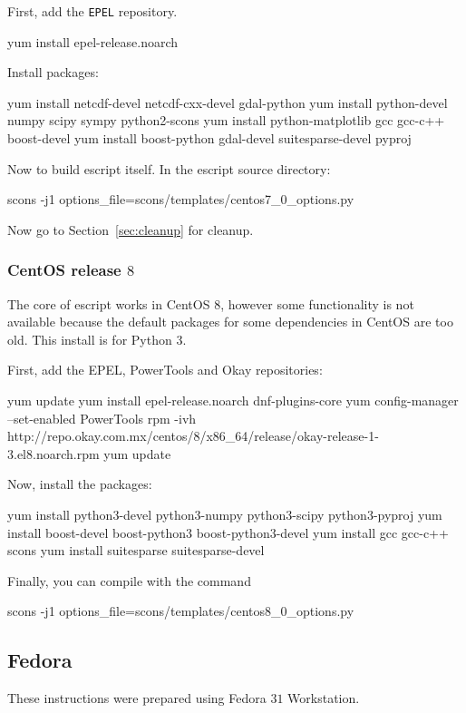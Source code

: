\noindent First, add the \texttt{EPEL} repository.
\begin{shellCode}
yum install epel-release.noarch
\end{shellCode}

\noindent Install packages:
\begin{shellCode}
yum install netcdf-devel netcdf-cxx-devel gdal-python
yum install python-devel numpy scipy sympy python2-scons
yum install python-matplotlib gcc gcc-c++ boost-devel
yum install boost-python gdal-devel suitesparse-devel pyproj
\end{shellCode}

\noindent Now to build escript itself.
In the escript source directory:
\begin{shellCode}
scons -j1 options_file=scons/templates/centos7_0_options.py
\end{shellCode}

\noindent Now go to Section~\ref{sec:cleanup} for cleanup.

\subsubsection{CentOS release $8$}
The core of escript works in CentOS $8$, however some functionality is not available because the default packages for some dependencies in CentOS are too old. This install is for Python 3.

First, add the EPEL, PowerTools and Okay repositories:
\begin{shellCode}
yum update
yum install epel-release.noarch dnf-plugins-core
yum config-manager --set-enabled PowerTools
rpm -ivh http://repo.okay.com.mx/centos/8/x86_64/release/okay-release-1-3.el8.noarch.rpm
yum update
\end{shellCode}

Now, install the packages:
\begin{shellCode}
yum install python3-devel python3-numpy python3-scipy python3-pyproj
yum install boost-devel boost-python3 boost-python3-devel
yum install gcc gcc-c++ scons
yum install suitesparse suitesparse-devel 
\end{shellCode}

Finally, you can compile \escript with the command
\begin{shellCode}
scons -j1 options_file=scons/templates/centos8_0_options.py
\end{shellCode}

\subsection{Fedora}\label{sec:fedorasrc}
These instructions were prepared using Fedora $31$ Workstation.

